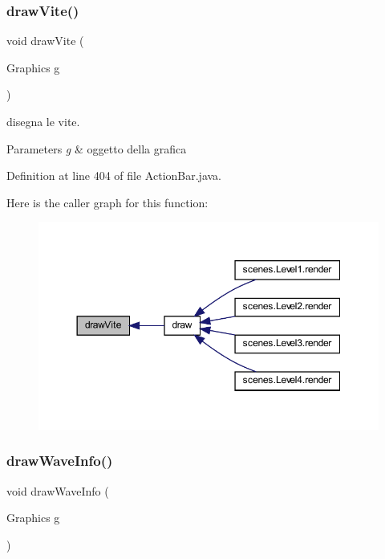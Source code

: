 \subsubsection{\texorpdfstring{draw\+Vite()}{drawVite()}}
{\footnotesize\ttfamily void draw\+Vite (\begin{DoxyParamCaption}\item[{Graphics}]{g }\end{DoxyParamCaption})}



disegna le vite. 


\begin{DoxyParams}{Parameters}
{\em g} & oggetto della grafica \\
\hline
\end{DoxyParams}


Definition at line 404 of file Action\+Bar.\+java.

Here is the caller graph for this function\+:\nopagebreak
\begin{figure}[H]
\begin{center}
\leavevmode
\includegraphics[width=350pt]{classui_1_1_action_bar_a7075e1ba9a7135d89d02dca2e3b8860e_icgraph}
\end{center}
\end{figure}
\mbox{\label{classui_1_1_action_bar_a4202926f30a7290c360bfcd4af6b03cb}} 
\subsubsection{\texorpdfstring{draw\+Wave\+Info()}{drawWaveInfo()}}
{\footnotesize\ttfamily void draw\+Wave\+Info (\begin{DoxyParamCaption}\item[{Graphics}]{g }\end{DoxyParamCaption})}



